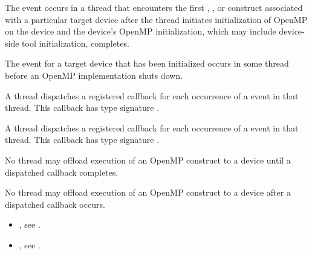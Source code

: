 \events

The  event occurs in a thread that encounters
the first , , or  construct associated with a particular target device 
after the thread initiates initialization of OpenMP on the device and the
device's OpenMP initialization, which may include device-side tool
initialization, completes. 

The  event for a target device that has been initialized
occurs in some thread before an OpenMP implementation shuts down.

\tools 

A thread dispatches a registered 
callback for each occurrence of a  event in
that thread.  This callback has type signature
.

A thread dispatches a registered 
callback for each occurrence of a  event in
that thread.  This callback has type signature
.

\restrictions
No thread may offload execution of an OpenMP construct to a device until a 
dispatched  callback completes.

No thread may offload execution of an OpenMP construct to a device after a 
dispatched  callback occurs.

\crossreferences
\begin{itemize}
\item {}, see
.
\item {}, see
.
\end{itemize}


